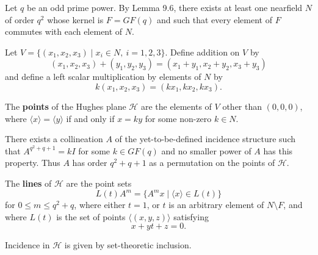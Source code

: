 Let $q$ be an odd prime power. By Lemma 9.6, there exists at least one nearfield $N$ of order $q^2$ whose kernel is $F = GF(q)$ and such that every element of $F$ commutes with each element of $N$.

Let $V = \{(x_1, x_2, x_3) \mid x_i \in N,\ i = 1, 2, 3\}$. Define addition on $V$ by
$$(x_1, x_2, x_3) + (y_1, y_2, y_3) = (x_1 + y_1, x_2 + y_2, x_3 + y_3)$$
and define a left scalar multiplication by elements of $N$ by
$$k(x_1, x_2, x_3) = (kx_1, kx_2, kx_3).$$

The \textbf{points} of the Hughes plane $\mathcal{H}$ are the elements of $V$ other than $(0,0,0)$, where $\langle x \rangle = \langle y \rangle$ if and only if $x = ky$ for some non-zero $k \in N$.

There exists a collineation $A$ of the yet-to-be-defined incidence structure such that $A^{q^2+q+1} = kI$ for some $k \in GF(q)$ and no smaller power of $A$ has this property. Thus $A$ has order $q^2+q+1$ as a permutation on the points of $\mathcal{H}$.

The \textbf{lines} of $\mathcal{H}$ are the point sets
$$L(t)A^m = \{A^m x \mid \langle x \rangle \in L(t)\}$$
for $0 \leq m \leq q^2+q$, where either $t = 1$, or $t$ is an arbitrary element of $N \setminus F$, and where $L(t)$ is the set of points $\langle (x, y, z) \rangle$ satisfying
$$x + yt + z = 0.$$

Incidence in $\mathcal{H}$ is given by set-theoretic inclusion.
